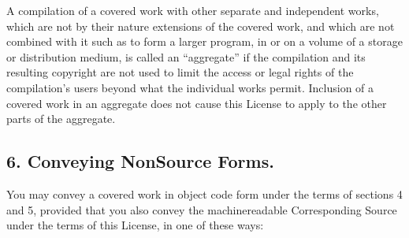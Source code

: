 \documentclass[letterpaper,10pt,english]{sphinxmanual}
\begin{document}
\sphinxAtStartPar
A compilation of a covered work with other separate and independent
works, which are not by their nature extensions of the covered work,
and which are not combined with it such as to form a larger program,
in or on a volume of a storage or distribution medium, is called an
“aggregate” if the compilation and its resulting copyright are not
used to limit the access or legal rights of the compilation’s users
beyond what the individual works permit.  Inclusion of a covered work
in an aggregate does not cause this License to apply to the other
parts of the aggregate.


\subsection{6. Conveying Non\sphinxhyphen{}Source Forms.}
\label{\detokenize{license:conveying-non-source-forms}}
\sphinxAtStartPar
You may convey a covered work in object code form under the terms
of sections 4 and 5, provided that you also convey the
machine\sphinxhyphen{}readable Corresponding Source under the terms of this License,
in one of these ways:
\end{document}
